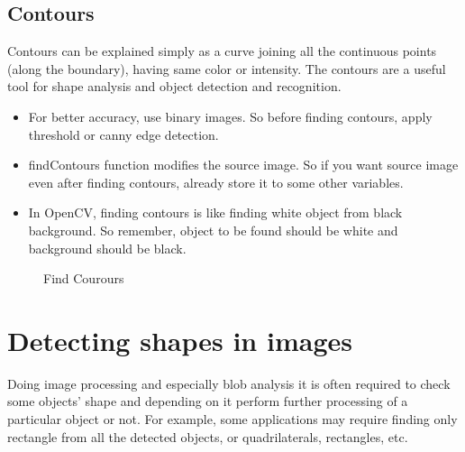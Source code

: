 \begin{enumerate}
\section{Contours}
Contours can be explained simply as a curve joining all the continuous points (along the boundary), having same color or intensity. The contours are a useful tool for shape analysis and object detection and recognition. \cite{Contours}
\begin{itemize}
\item For better accuracy, use binary images. So before finding contours, apply threshold or canny edge detection.
\item findContours function modifies the source image. So if you want source image even after finding contours, already store it to some other variables.
\item In OpenCV, finding contours is like finding white object from black background. So remember, object to be found should be white and background should be black.
\end{itemize}
\begin{figure}[H]
\centering
{}
\caption {Find Courours}
\label {fig:Amino_Acid}
\end{figure}
\end{enumerate}
\section{Detecting shapes in images}
\label{Shape}
Doing image processing and especially blob analysis it is often required to check some objects' shape and depending on it perform further processing of a particular object or not. For example, some applications may require finding only rectangle from all the detected objects, or quadrilaterals, rectangles, etc. \cite{DetectingShape}
